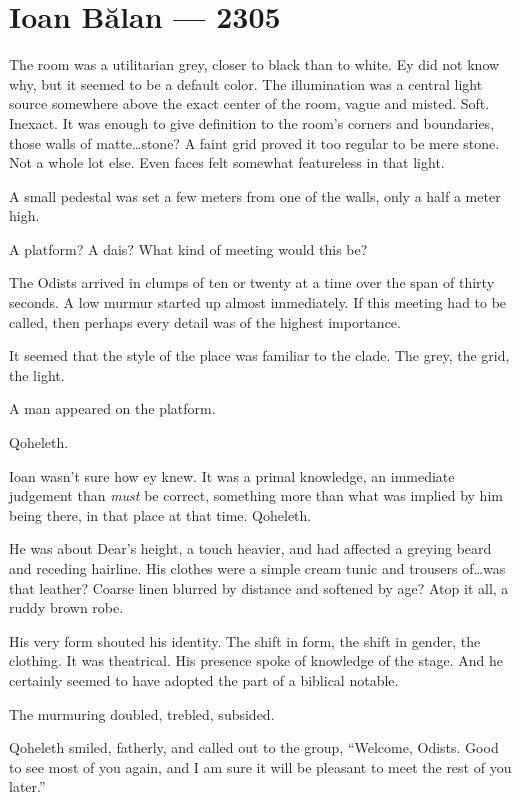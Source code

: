 \hypertarget{ioan-bux103lan-2305}{%
\chapter*{Ioan Bălan — 2305}\label{ioan-bux103lan-2305}}

The room was a utilitarian grey, closer to black than to white. Ey did not know why, but it seemed to be a default color. The illumination was a central light source somewhere above the exact center of the room, vague and misted. Soft. Inexact. It was enough to give definition to the room's corners and boundaries, those walls of matte\ldots{}stone? A faint grid proved it too regular to be mere stone. Not a whole lot else. Even faces felt somewhat featureless in that light.

A small pedestal was set a few meters from one of the walls, only a half a meter high.

A platform? A dais? What kind of meeting would this be?

The Odists arrived in clumps of ten or twenty at a time over the span of thirty seconds. A low murmur started up almost immediately. If this meeting had to be called, then perhaps every detail was of the highest importance.

It seemed that the style of the place was familiar to the clade. The grey, the grid, the light.

A man appeared on the platform.

Qoheleth.

Ioan wasn't sure how ey knew. It was a primal knowledge, an immediate judgement than \emph{must} be correct, something more than what was implied by him being there, in that place at that time. Qoheleth.

He was about Dear's height, a touch heavier, and had affected a greying beard and receding hairline. His clothes were a simple cream tunic and trousers of\ldots{}was that leather? Coarse linen blurred by distance and softened by age? Atop it all, a ruddy brown robe.

His very form shouted his identity. The shift in form, the shift in gender, the clothing. It was theatrical. His presence spoke of knowledge of the stage. And he certainly seemed to have adopted the part of a biblical notable.

The murmuring doubled, trebled, subsided.

Qoheleth smiled, fatherly, and called out to the group, ``Welcome, Odists. Good to see most of you again, and I am sure it will be pleasant to meet the rest of you later.''

